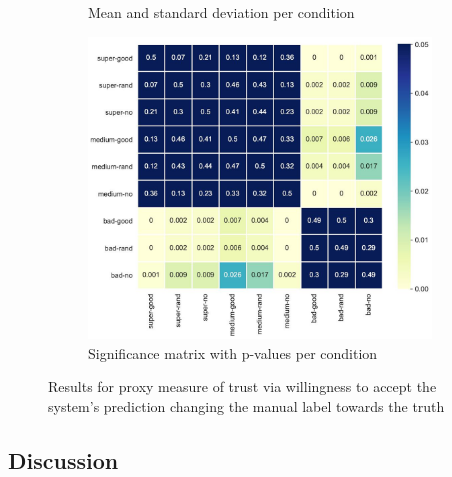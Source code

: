 \begin{figure}[H]
	\begin{subfigure}[b]{0.3\textwidth}
		\caption{Mean and standard deviation per condition}
		\label{tab:results_table_proxy_towards}
	\end{subfigure}
	\begin{subfigure}[b]{0.65\textwidth}
		\includegraphics[width=\textwidth]{img/results_matrix_proxy_towards2.JPG}
		\caption{Significance matrix with p-values per condition}
		\label{fig:results_matrix_proxy_towards}
	\end{subfigure}
	\caption{Results for proxy measure of trust via willingness to accept the system's prediction changing the manual label towards the truth}
	\label{fig:results_proxy_towards}
\end{figure}



\subsection{Discussion}